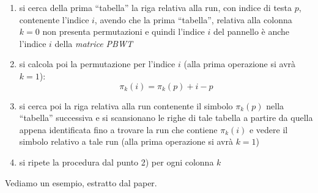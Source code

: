 \begin{enumerate}
  \item si cerca della prima ``tabella'' la riga relativa alla run, con indice
  di testa $p$, contenente
  l'indice $i$, avendo che la prima ``tabella'', relativa alla colonna $k=0$ non
  presenta permutazioni e quindi 
  l'indice $i$ del pannello è anche l'indice $i$ della \textit{matrice PBWT}
  \item si calcola poi la permutazione per l'indice $i$ (alla prima operazione
  si avrà $k=1$):
  \[\pi_k(i)=\pi_k(p)+i-p\]
  \item si cerca poi la riga relativa alla run contenente il simbolo $\pi_k(p)$
  nella ``tabella'' successiva e si scansionano le righe di tale tabella a
  partire da quella appena identificata fino a trovare la run che contiene
  $\pi_k(i)$ e vedere il simbolo relativo a tale run (alla prima operazione
  si avrà $k=1$)
  \item si ripete la procedura dal punto 2) per ogni colonna $k$
\end{enumerate}
Vediamo un esempio, estratto dal paper.
